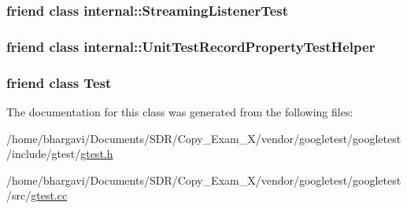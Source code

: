 \subsubsection[{\texorpdfstring{internal\+::\+Streaming\+Listener\+Test}{internal::StreamingListenerTest}}]{\setlength{\rightskip}{0pt plus 5cm}friend class internal\+::\+Streaming\+Listener\+Test\hspace{0.3cm}{\ttfamily [friend]}}\hypertarget{classtesting_1_1_unit_test_adc037d188dab349a94868991955c9cd4}{}\label{classtesting_1_1_unit_test_adc037d188dab349a94868991955c9cd4}
\subsubsection[{\texorpdfstring{internal\+::\+Unit\+Test\+Record\+Property\+Test\+Helper}{internal::UnitTestRecordPropertyTestHelper}}]{\setlength{\rightskip}{0pt plus 5cm}friend class {\bf internal\+::\+Unit\+Test\+Record\+Property\+Test\+Helper}\hspace{0.3cm}{\ttfamily [friend]}}\hypertarget{classtesting_1_1_unit_test_ae970f89a9f477a349fe5778be85ef42e}{}\label{classtesting_1_1_unit_test_ae970f89a9f477a349fe5778be85ef42e}
\subsubsection[{\texorpdfstring{Test}{Test}}]{\setlength{\rightskip}{0pt plus 5cm}friend class {\bf Test}\hspace{0.3cm}{\ttfamily [friend]}}\hypertarget{classtesting_1_1_unit_test_a5b78b1c2e1fa07ffed92da365593eaa4}{}\label{classtesting_1_1_unit_test_a5b78b1c2e1fa07ffed92da365593eaa4}


The documentation for this class was generated from the following files\+:\begin{DoxyCompactItemize}
\item 
/home/bhargavi/\+Documents/\+S\+D\+R/\+Copy\+\_\+\+Exam\+\_\+X/vendor/googletest/googletest/include/gtest/\hyperlink{gtest_8h}{gtest.\+h}\item 
/home/bhargavi/\+Documents/\+S\+D\+R/\+Copy\+\_\+\+Exam\+\_\+X/vendor/googletest/googletest/src/\hyperlink{gtest_8cc}{gtest.\+cc}\end{DoxyCompactItemize}
